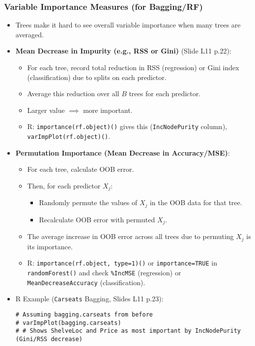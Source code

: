 \documentclass[12pt,a4paper]{article}
\newcommand{\Rfunction}[1]{\texttt{#1()}} %
\newcommand{\Robject}[1]{\texttt{#1}} %
\newcommand{\Rcode}[1]{\texttt{#1}} %
\begin{document}
\begin{itemize}
    \subsubsection{Variable Importance Measures (for Bagging/RF)}
        \begin{itemize}
            \item Trees make it hard to see overall variable importance when many trees are averaged.
            \item \textbf{Mean Decrease in Impurity (e.g., RSS or Gini)} (Slide L11 p.22):
                \begin{itemize}
                    \item For each tree, record total reduction in RSS (regression) or Gini index (classification) due to splits on each predictor.
                    \item Average this reduction over all $B$ trees for each predictor.
                    \item Larger value $\implies$ more important.
                    \item R: \Rfunction{importance(rf.object)} gives this (\Rcode{IncNodePurity} column), \Rfunction{varImpPlot(rf.object)}.
                \end{itemize}
            \item \textbf{Permutation Importance (Mean Decrease in Accuracy/MSE)}:
                \begin{itemize}
                    \item For each tree, calculate OOB error.
                    \item Then, for each predictor $X_j$:
                        \begin{itemize}
                            \item Randomly permute the values of $X_j$ in the OOB data for that tree.
                            \item Recalculate OOB error with permuted $X_j$.
                        \end{itemize}
                    \item The average increase in OOB error across all trees due to permuting $X_j$ is its importance.
                    \item R: \Rfunction{importance(rf.object, type=1)} or \Rcode{importance=TRUE} in \Rfunction{randomForest} and check \Rcode{\%IncMSE} (regression) or \Rcode{MeanDecreaseAccuracy} (classification).
                \end{itemize}
            \item R Example (\Robject{Carseats} Bagging, Slides L11 p.23):
\begin{lstlisting}[caption={Variable Importance Plot (Slide L11 p.23)}]
# Assuming bagging.carseats from before
# varImpPlot(bagging.carseats) 
# # Shows ShelveLoc and Price as most important by IncNodePurity (Gini/RSS decrease)
\end{lstlisting}
        \end{itemize}


\end{itemize}
\end{document}
